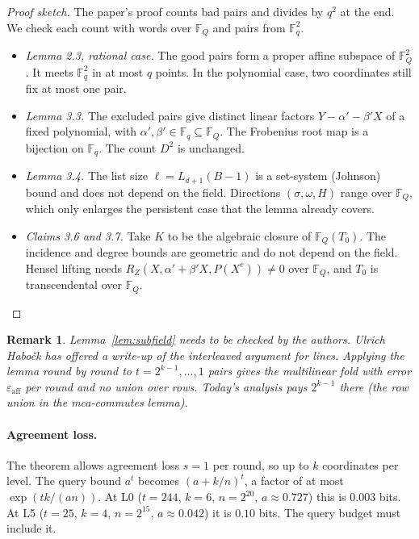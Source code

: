 \documentclass[11pt]{article}
\newcommand{\F}{\mathbb{F}}
\newcommand{\eps}{\varepsilon}
\newtheorem{remark}[theorem]{Remark}
\begin{document}
\begin{proof}[Proof sketch]
The paper's proof counts bad pairs and divides by $q^2$ at the end.
We check each count with words over $\F_Q$ and pairs from $\F_q^2$.
\begin{itemize}[leftmargin=1.5em]
\item \emph{Lemma 2.3, rational case.} The good pairs form a proper
  affine subspace of $\F_Q^2$. It meets $\F_q^2$ in at most $q$
  points. In the polynomial case, two coordinates still fix at most
  one pair.
\item \emph{Lemma 3.3.} The excluded pairs give distinct linear factors
  $Y - \alpha' - \beta' X$ of a fixed polynomial, with $\alpha',
  \beta' \in \F_q \subseteq \F_Q$. The Frobenius root map is a
  bijection on $\F_q$. The count $D^2$ is unchanged.
\item \emph{Lemma 3.4.} The list size $\ell = L_{d+1}(B-1)$ is a
  set-system (Johnson) bound and does not depend on the field.
  Directions $(\sigma, \omega, H)$ range over $\F_Q$, which only
  enlarges the persistent case that the lemma already covers.
\item \emph{Claims 3.6 and 3.7.} Take $K$ to be the algebraic closure
  of $\F_Q(T_0)$. The incidence and degree bounds are geometric and do
  not depend on the field. Hensel lifting needs $R_Z(X, \alpha' +
  \beta' X, P(X^e)) \ne 0$ over $\F_Q$, and $T_0$ is transcendental
  over $\F_Q$.
\end{itemize}
\end{proof}

\begin{remark}
Lemma~\ref{lem:subfield} needs to be checked by the authors. Ulrich
Habo\v{c}k has offered a write-up of the interleaved argument for
lines. Applying the lemma round by round to $t = 2^{k-1}, \dots, 1$
pairs gives the multilinear fold with error $\eps_{\mathrm{aff}}$ per
round and \emph{no} union over rows. Today's analysis pays $2^{k-1}$
there (the row union in the mca-commutes lemma).
\end{remark}

\paragraph{Agreement loss.} The theorem allows agreement loss $s = 1$
per round, so up to $k$ coordinates per level. The query bound
$a^t$ becomes $(a + k/n)^t$, a factor of at most $\exp(tk/(an))$. At
L0 ($t = 244$, $k = 6$, $n = 2^{20}$, $a \approx 0.727$) this is
$0.003$ bits. At L5 ($t = 25$, $k = 4$, $n = 2^{15}$, $a \approx
0.042$) it is $0.10$ bits. The query budget must include it.
\end{document}
